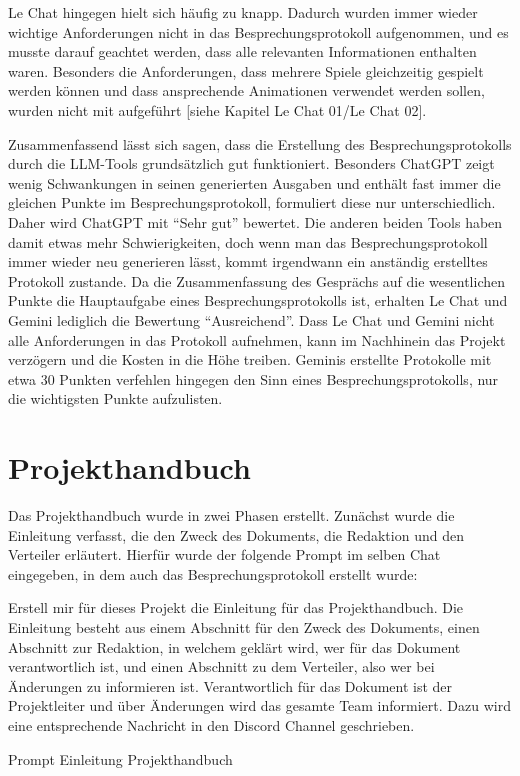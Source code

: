 Le Chat hingegen hielt sich häufig zu knapp. Dadurch wurden immer wieder wichtige Anforderungen nicht in das 
Besprechungsprotokoll aufgenommen, und es musste darauf geachtet werden, dass alle relevanten Informationen enthalten 
waren. Besonders die Anforderungen, dass mehrere Spiele gleichzeitig gespielt werden können und dass ansprechende 
Animationen verwendet werden sollen, wurden nicht mit aufgeführt [siehe Kapitel Le Chat 01/Le Chat 02].

Zusammenfassend lässt sich sagen, dass die Erstellung des Besprechungsprotokolls durch die LLM-Tools grundsätzlich 
gut funktioniert. Besonders ChatGPT zeigt wenig Schwankungen in seinen generierten Ausgaben und enthält fast immer 
die gleichen Punkte im Besprechungsprotokoll, formuliert diese nur unterschiedlich. Daher wird ChatGPT mit 
``Sehr gut'' bewertet. Die anderen beiden Tools haben damit etwas mehr Schwierigkeiten, doch wenn man das 
Besprechungsprotokoll immer wieder neu generieren lässt, kommt irgendwann ein anständig erstelltes Protokoll 
zustande. Da die Zusammenfassung des Gesprächs auf die wesentlichen Punkte die Hauptaufgabe eines Besprechungsprotokolls 
ist, erhalten Le Chat und Gemini lediglich die Bewertung ``Ausreichend''. Dass Le Chat und Gemini nicht alle Anforderungen 
in das Protokoll aufnehmen, kann im Nachhinein das Projekt verzögern und die Kosten in die Höhe treiben. Geminis 
erstellte Protokolle mit etwa 30 Punkten verfehlen hingegen den Sinn eines Besprechungsprotokolls, nur die wichtigsten Punkte aufzulisten.

\section{Projekthandbuch}  \label{CompProjekthandbuch}

Das Projekthandbuch wurde in zwei Phasen erstellt. Zunächst wurde die Einleitung verfasst, die den Zweck des 
Dokuments, die Redaktion und den Verteiler erläutert. Hierfür wurde der folgende Prompt im selben Chat eingegeben, 
in dem auch das Besprechungsprotokoll erstellt wurde:

\begin{prompt}[H]
    \begin{tcolorbox}[colback=gray!20, colframe=gray!20, boxrule=0pt, sharp corners]
        Erstell mir für dieses Projekt die Einleitung für das Projekthandbuch. Die Einleitung besteht aus einem 
        Abschnitt für den Zweck des Dokuments, einen Abschnitt zur Redaktion, in welchem geklärt wird, wer für das 
        Dokument verantwortlich ist, und einen Abschnitt zu dem Verteiler, also wer bei Änderungen zu informieren ist. 
        Verantwortlich für das Dokument ist der Projektleiter und über Änderungen wird das gesamte Team informiert. 
        Dazu wird eine entsprechende Nachricht in den Discord Channel geschrieben.
        \vfill
    \end{tcolorbox}
    \caption{Prompt Einleitung Projekthandbuch}
    \label{Prompt Einleitung Projekthandbuch}
\end{prompt}

